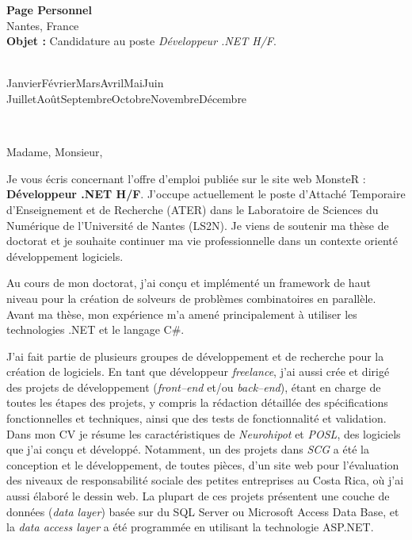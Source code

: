 \documentclass[11pt,a4paper]{letter} %
\def\today{\number\day\space\ifcase\month\or
  Janvier\or Février\or Mars\or Avril\or Mai\or Juin\or
  Juillet\or Août\or Septembre\or Octobre\or Novembre\or Décembre\fi
  \space\number\year}
\def\opening#1{\thispagestyle{empty}
{\centering\fromaddress \vspace{0.6in} \\ %
\hspace{6cm}\today\hspace*{\fill}\par} %
{\raggedright \toname \\ \toaddress \par} %
\vspace{0.4in} %
\noindent #1 %
}
\newcommand{\entreprise}{Page Personnel}
\newcommand{\poste}{Développeur .NET H/F}
\newcommand{\where}{publiée sur le site web MonsteR :~}
\newcommand{\intro}{Je vous écris concernant l'offre d'emploi \where 
\textbf{\poste}. 
J'occupe actuellement le poste d'Attaché Temporaire d'Enseignement et de Recherche (ATER) dans le Laboratoire de Sciences du Numérique de l'Université de Nantes (LS2N). Je viens de soutenir ma thèse de doctorat et je souhaite continuer ma vie professionnelle dans un contexte orienté développement logiciels.}
\begin{document}

\begin{letter}
{{\bf \entreprise}\\Nantes, France\\
\vspace{0.2in}
\textbf{Objet :} Candidature au poste \textit{\poste}.
}


\opening{Madame, Monsieur,}

\intro{}

Au cours de mon doctorat, j'ai con\c cu et implémenté un framework de haut niveau pour la création de solveurs de problèmes combinatoires en parallèle. %
Avant ma thèse, mon expérience m'a amené principalement à utiliser les technologies .NET et le langage C\#. %

J'ai fait partie de plusieurs groupes de développement et de recherche pour la création de logiciels. En tant que développeur \textit{freelance}, j'ai aussi crée et dirigé des projets de développement (\textit{front--end} et/ou \textit{back--end}), étant en charge de toutes les étapes des projets, y compris la rédaction détaillée des spécifications fonctionnelles et techniques, ainsi que des tests de fonctionnalité et validation.
Dans mon CV je résume les caractéristiques de \textit{Neurohipot} et \textit{POSL}, des logiciels que j'ai conçu et développé. Notamment, un des projets dans \textit{SCG} a été la conception et le développement, de toutes pièces, d'un site web pour l'évaluation des niveaux de responsabilité sociale des petites entreprises au Costa Rica, où j'ai aussi élaboré le dessin web.
La plupart de ces projets présentent une couche de données (\textit{data layer}) basée sur du SQL Server ou Microsoft Access Data Base, et la \textit{data access layer} a été programmée en utilisant la technologie ASP.NET.


\end{letter}
\end{document}
